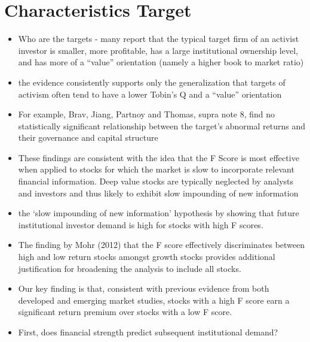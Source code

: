 \documentclass[12pt]{article}
\begin{document}
\section{Characteristics Target}

    \begin{itemize}

        \item Who are the targets - many report that the typical target firm of an activist investor is smaller, more profitable, has a large institutional ownership level, and has more of a “value” orientation (namely a higher book to market ratio) \citep{CoffeeJr.2014}

        \item the evidence consistently supports only the generalization that targets of activism often tend to have a lower Tobin’s Q and a “value” orientation \citep{CoffeeJr.2014}

        \item For example, Brav, Jiang, Partnoy and Thomas, supra note 8, find no statistically significant relationship between the target’s abnormal returns and their governance and capital structure \citep{CoffeeJr.2014}

        \item These findings are consistent with the idea that the F Score is most effective when applied to stocks for which the market is slow to incorporate relevant financial information. Deep value stocks are typically neglected by analysts and investors and thus likely to exhibit slow impounding of new information \citep{Hyde2014}

        \item the ‘slow impounding of new information’ hypothesis by showing that future institutional investor demand is high for stocks with high F scores. \citep{Hyde2014}

        \item The finding by Mohr (2012) that the F score effectively discriminates between high and low return stocks amongst growth stocks provides additional justification for broadening the analysis to include all stocks. \citep{Hyde2014}

        \item Our key finding is that, consistent with previous evidence from both developed and emerging market studies, stocks with a high F score earn a significant return premium over stocks with a low F score.\citep{Hyde2014}

        \item First, does financial strength predict subsequent institutional demand? \citep{Choi2012}


\end{itemize}
\end{document}
